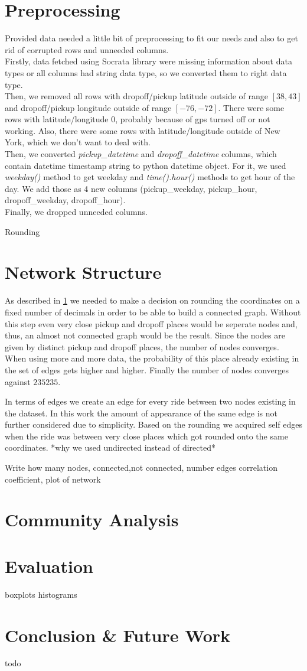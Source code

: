 \documentclass[sigconf]{acmart}
\begin{document}
\section{Preprocessing}
\label{preprocessing}
Provided data needed a little bit of preprocessing to fit our needs and also to get rid of corrupted rows and unneeded columns. \\
Firstly, data fetched using Socrata library were missing information about data types or all columns had string data type, so we converted them to right data type. \\
Then, we removed all rows with dropoff/pickup latitude outside of range \(\left[38, 43\right]\) and dropoff/pickup longitude outside of range \(\left[-76, -72\right]\). There were some rows with latitude/longitude $0$, probably because of gps turned off or not working. Also, there were some rows with latitude/longitude outside of New York, which we don't want to deal with. \\
Then, we converted \emph{pickup\_datetime} and \emph{dropoff\_datetime} columns, which contain datetime timestamp string to python datetime object. For it, we used \emph{weekday()} method to get weekday and \emph{time().hour()} methods to get hour of the day. We add those as 4 new columns (pickup\_weekday, pickup\_hour, dropoff\_weekday, dropoff\_hour). \\
Finally, we dropped unneeded columns.

Rounding

\section{Network Structure}
As described in \ref{preprocessing} we needed to make a decision on rounding the coordinates on a fixed number of decimals in order to be able to build a connected graph. Without this step even very close pickup and dropoff places would be seperate nodes and, thus, an almost not connected graph would be the result. Since the nodes are given by distinct pickup and dropoff places, the number of nodes converges. When using more and more data, the probability of this place already existing in the set of edges gets higher and higher. Finally the number of nodes converges against $ 235235$.

In terms of edges we create an edge for every ride between two nodes existing in the dataset. In this work the amount of appearance of the same edge is not further considered due to simplicity. Based on the rounding we acquired self edges when the ride was between very close places which got rounded onto the same coordinates. *why we used undirected instead of directed*




Write how many nodes, connected,not connected, number edges correlation coefficient, plot of network

\section{Community Analysis}

\section{Evaluation}
boxplots  histograms


\section{Conclusion \& Future Work}
todo
\end{document}
